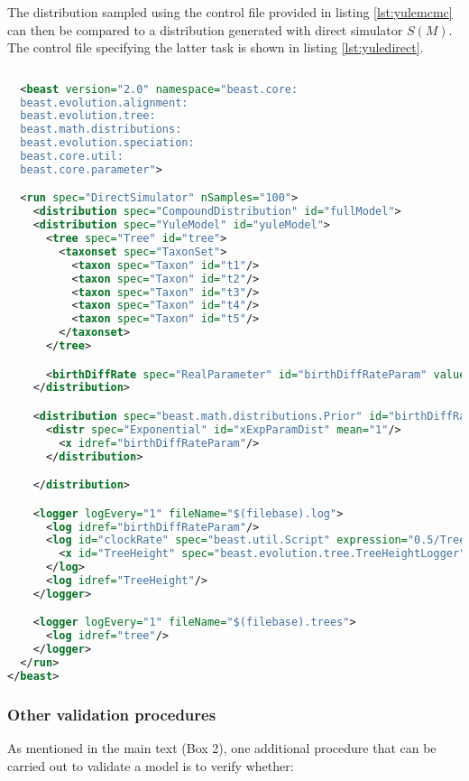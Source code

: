 \documentclass[oneside]{article}
\begin{document}
The distribution sampled using the control file provided in listing
\ref{lst:yulemcmc} can then be compared to a distribution generated
with direct simulator $S(M)$.
The control file specifying the latter task is shown in listing
\ref{lst:yuledirect}.

{\small
\singlespacing
\begin{lstlisting}[language=XML, caption=BEAST 2 control file for
  generating a distribution under the Yule model with direct simulation., label={lst:yuledirect}]
  
  <beast version="2.0" namespace="beast.core:
  beast.evolution.alignment:
  beast.evolution.tree:
  beast.math.distributions:
  beast.evolution.speciation:
  beast.core.util:
  beast.core.parameter">

  <run spec="DirectSimulator" nSamples="100">
    <distribution spec="CompoundDistribution" id="fullModel">
    <distribution spec="YuleModel" id="yuleModel">
      <tree spec="Tree" id="tree">
        <taxonset spec="TaxonSet">
          <taxon spec="Taxon" id="t1"/>
          <taxon spec="Taxon" id="t2"/>
          <taxon spec="Taxon" id="t3"/>
          <taxon spec="Taxon" id="t4"/>
          <taxon spec="Taxon" id="t5"/>
        </taxonset>
      </tree>

      <birthDiffRate spec="RealParameter" id="birthDiffRateParam" value="1.0"/>
    </distribution>

    <distribution spec="beast.math.distributions.Prior" id="birthDiffRatePrior">
      <distr spec="Exponential" id="xExpParamDist" mean="1"/>
        <x idref="birthDiffRateParam"/>
      </distribution>

    </distribution>

    <logger logEvery="1" fileName="$(filebase).log">
      <log idref="birthDiffRateParam"/>
      <log id="clockRate" spec="beast.util.Script" expression="0.5/TreeHeight">
        <x id="TreeHeight" spec="beast.evolution.tree.TreeHeightLogger" tree="@tree"/>
      </log>
      <log idref="TreeHeight"/>
    </logger>

    <logger logEvery="1" fileName="$(filebase).trees">
      <log idref="tree"/>
    </logger>
  </run>
</beast>
\end{lstlisting}
}

\subsubsection*{Other validation procedures}

As mentioned in the main text (Box 2), one additional procedure
that can be carried out to validate a model is to verify whether:
\end{document}
